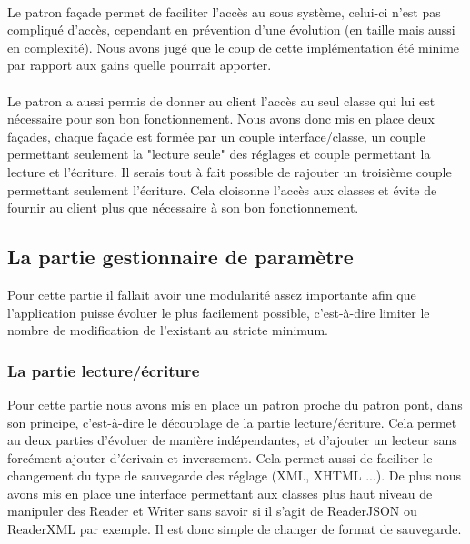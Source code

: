 \documentclass[12pt]{article}
\begin{document}
	\paragraph{}
	Le patron façade permet de faciliter l'accès au sous système, celui-ci n'est pas compliqué d'accès, cependant en prévention d'une évolution (en taille mais aussi en complexité). Nous avons jugé que le coup de cette implémentation été minime par rapport aux gains quelle pourrait apporter.
	
	\paragraph{}
	Le patron a aussi permis de donner au client l'accès au seul classe qui lui est nécessaire pour son bon fonctionnement. Nous avons donc mis en place deux façades, chaque façade est formée par un couple interface/classe, un couple permettant seulement la "lecture seule" des réglages et couple permettant la lecture et l'écriture. Il serais tout à fait possible de rajouter un troisième couple permettant seulement l'écriture. Cela cloisonne l'accès aux classes et évite de fournir au client plus que nécessaire à son bon fonctionnement. 
	
	\newpage
	\subsection{La partie gestionnaire de paramètre}
	
	Pour cette partie il fallait avoir une modularité assez importante afin que l'application puisse évoluer le plus facilement possible, c'est-à-dire limiter le nombre de modification de l'existant au stricte minimum.
	
	\subsubsection{La partie lecture/écriture}
	
		Pour cette partie nous avons mis en place un patron proche du patron pont, dans son principe, c'est-à-dire le découplage de la partie lecture/écriture. Cela permet au deux parties d'évoluer de manière indépendantes, et d'ajouter un lecteur sans forcément ajouter d'écrivain et inversement. Cela permet aussi de faciliter le changement du type de sauvegarde des réglage (XML, XHTML ...). De plus nous avons mis en place une interface permettant aux classes plus haut niveau de manipuler des Reader et Writer sans savoir si il s'agit de ReaderJSON ou ReaderXML par exemple. Il est donc simple de changer de format de sauvegarde.
		
\end{document}
